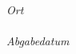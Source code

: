 \begin{titlepage}
\begin{center}
\vfill

{\large
\emph{Ort}\\
\tloc\\
\vspace{0.2cm}
\emph{Abgabedatum}\\
\tdate\\
\vspace{1.5cm}
}
\vfill
\end{center}
\end{titlepage}
\restoregeometry